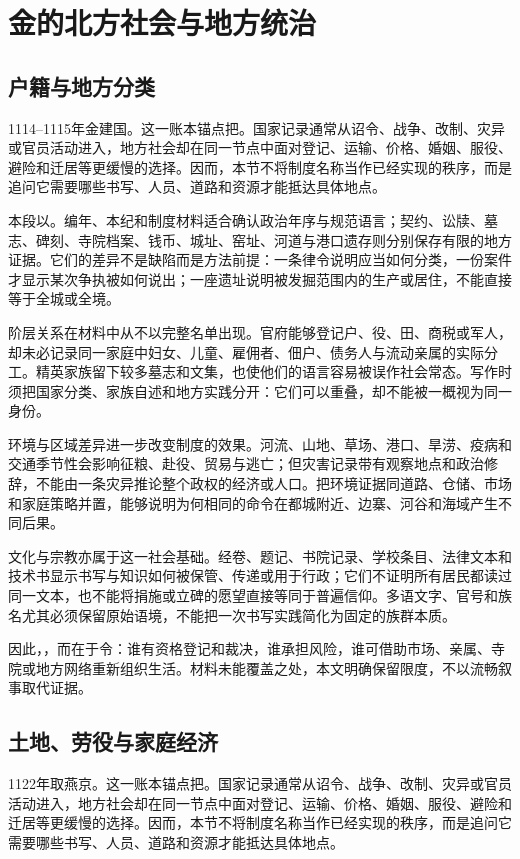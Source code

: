 \section{金的北方社会与地方统治}

\subsection{户籍与地方分类}

1114--1115年金建国。这一账本锚点把。国家记录通常从诏令、战争、改制、灾异或官员活动进入，地方社会却在同一节点中面对登记、运输、价格、婚姻、服役、避险和迁居等更缓慢的选择。因而，本节不将制度名称当作已经实现的秩序，而是追问它需要哪些书写、人员、道路和资源才能抵达具体地点。

本段以。编年、本纪和制度材料适合确认政治年序与规范语言；契约、讼牍、墓志、碑刻、寺院档案、钱币、城址、窑址、河道与港口遗存则分别保存有限的地方证据。它们的差异不是缺陷而是方法前提：一条律令说明应当如何分类，一份案件才显示某次争执被如何说出；一座遗址说明被发掘范围内的生产或居住，不能直接等于全城或全境。

阶层关系在材料中从不以完整名单出现。官府能够登记户、役、田、商税或军人，却未必记录同一家庭中妇女、儿童、雇佣者、佃户、债务人与流动亲属的实际分工。精英家族留下较多墓志和文集，也使他们的语言容易被误作社会常态。写作时须把国家分类、家族自述和地方实践分开：它们可以重叠，却不能被一概视为同一身份。

环境与区域差异进一步改变制度的效果。河流、山地、草场、港口、旱涝、疫病和交通季节性会影响征粮、赴役、贸易与逃亡；但灾害记录带有观察地点和政治修辞，不能由一条灾异推论整个政权的经济或人口。把环境证据同道路、仓储、市场和家庭策略并置，能够说明为何相同的命令在都城附近、边寨、河谷和海域产生不同后果。

文化与宗教亦属于这一社会基础。经卷、题记、书院记录、学校条目、法律文本和技术书显示书写与知识如何被保管、传递或用于行政；它们不证明所有居民都读过同一文本，也不能将捐施或立碑的愿望直接等同于普遍信仰。多语文字、官号和族名尤其必须保留原始语境，不能把一次书写实践简化为固定的族群本质。

因此，，而在于令：谁有资格登记和裁决，谁承担风险，谁可借助市场、亲属、寺院或地方网络重新组织生活。材料未能覆盖之处，本文明确保留限度，不以流畅叙事取代证据。

\subsection{土地、劳役与家庭经济}

1122年取燕京。这一账本锚点把。国家记录通常从诏令、战争、改制、灾异或官员活动进入，地方社会却在同一节点中面对登记、运输、价格、婚姻、服役、避险和迁居等更缓慢的选择。因而，本节不将制度名称当作已经实现的秩序，而是追问它需要哪些书写、人员、道路和资源才能抵达具体地点。

